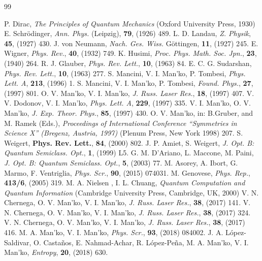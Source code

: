 \documentclass[12pt]{article}
\begin{document}
\begin{thebibliography}{99}

  P. Dirac, {\it The Principles of Quantum Mechanics} (Oxford University Press, 1930)
 E. Schr\"odinger, {\sl Ann. Phys. } (Leipzig), {\bf 79}, (1926) 489.
L. D. Landau, 
{\sl Z. Physik}, {\bf 45}, (1927) 430.
J. von Neumann, 
{\sl Nach. Ges. Wiss.} G\"ottingen, {\bf 11}, (1927) 245.
 E. Wigner,  {\sl Phys. Rev.}, {\bf 40}, (1932) 749.
 K. Husimi,  {\sl Proc. Phys. Math. Soc. Jpn.}, {\bf 23}, (1940) 264. 
 R. J. Glauber, {\sl  Phys. Rev. Lett.}, {\bf10}, (1963) 84.
 E. C. G. Sudarshan,  {\sl Phys. Rev. Lett.}, {\bf 10}, (1963) 277. 
S. Mancini, V. I. Man'ko,  P. Tombesi,  {\sl Phys. Lett. A}, {\bf 213}, (1996) 1.
 S. Mancini, V. I. Man'ko,  P. Tombesi,  {\sl Found. Phys.}, {\bf 27}, (1997) 801.
 O. V. Man'ko,  V. I. Man'ko,  {\sl J. Russ. Laser Res.}, {\bf 18}, (1997)  407.
V. V. Dodonov,  V. I. Man'ko,  {\sl Phys. Lett. A}, {\bf 229}, (1997) 335.
V. I. Man'ko,  O. V. Man'ko,  {\sl J. Exp. Theor. Phys.}, {\bf 85}, (1997) 430. 
O. V. Man'ko, in: B.Gruber, and M. Ramek (Eds.), {\it Proceedings of
	International Conference ``Symmetries in Science X'' (Bregenz,
	Austria, 1997)} (Plenum Press, New York 1998) 207.
S. Weigert,  {\bf Phys. Rev. Lett.}, {\bf 84}, (2000)  802.
 J.  P. Amiet,  S. Weigert,
{\sl J. Opt. B: Quantum Semiclass. Opt.}, {\bf1}, (1999)  L5.
 G. M. D'Ariano, L. Maccone,  M. Paini, 
{\sl J. Opt. B: Quantum Semiclass. Opt.}, {\bf 5}, (2003) 77.
M. Asorey, A. Ibort, G. Marmo,  F. Ventriglia, {\sl  Phys. Scr.},  
{\bf90}, (2015) 074031.
 M. Genovese,  {\sl Phys. Rep.}, {\bf 413/6}, (2005) 319.
M. A. Nielsen ,  I. L. Chuang, {\it Quantum Computation and Quantum Information}  (Cambridge University Press, Cambridge,
UK, 2000)
 V. N. Chernega, O. V. Man'ko, V. I. Man'ko, {\sl J. Russ. Laser Res.},  {\bf 38}, (2017) 
141.
 V. N. Chernega, O. V. Man'ko, V. I. Man'ko, {\sl J. Russ. Laser Res.},  {\bf38},  (2017) 
324.
  V.  N. Chernega, O. V. Man'ko, V. I. Man'ko, {\sl J. Russ. Laser Res.},  {\bf 38},  (2017) 416.
 M. A. Man'ko, V. I. Man'ko,  {\sl Phys. Scr.}, {\bf 93}, (2018) 084002.
J. A. L\'opez-Saldivar, O. Casta\~nos, E. Nahmad-Achar,  R. L\'opez-Pe\~na, M. A. Man'ko, V. I. Man'ko,  {\sl Entropy}, {\bf20}, (2018) 630.

\end{thebibliography}
\end{document}
